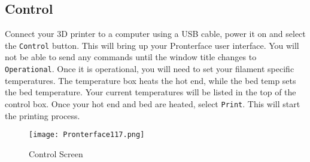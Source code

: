\begin{comment}

\subsubsection{Printing from USB Cable}
\index{Printing from USB}

Connect your 3D printer using a USB cable and select the \texttt{Print/Control} button. This will bring up the Pronterface user interface. You will not be able to send any commands until the window title changes to \texttt{Operational}. 

\subsubsection{Set Temperature}

Set your temperatures for the hot end and the bed. You will see two boxes, one labeled “Temperature” and one labeled “Bed Temp”. Temperature will set your hot end, and bed temp will set your bed. Once your hot end and bed have reached temperature, you will just need to select print.

\end{comment} 

\subsection{Control}
Connect your 3D printer to a computer using a USB cable, power it on and select the \texttt{Control} button. This will bring up your Pronterface user interface. You will not be able to send any commands until the window title changes to \texttt{Operational}. Once it is operational, you will need to set your filament specific temperatures. The temperature box heats the hot end, while the bed temp sets the bed temperature. Your current temperatures will be listed in the top of the control box. Once your hot end and bed are heated, select \texttt{Print}. This will start the printing process.

\begin{figure}[H]
\centering
\texttt{[image: Pronterface117.png]}
\caption{Control Screen}
\label{fig:Control}
\end{figure}


